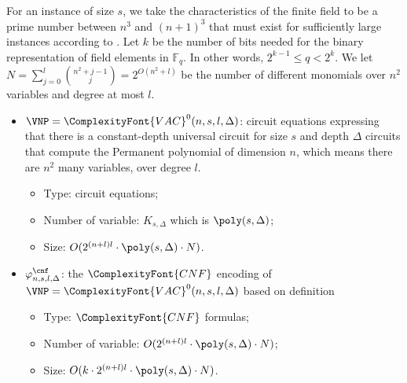 \documentclass[11pt,letter]{article}
\theoremstyle{remark} %
\newcommand{\alg}{\ComplexityFont{alg}}
\newcommand{\IPS}{%
    {
        \ComplexityFont{IPS} 
    }
}
\newcommand{\CNF}{ %
    {
        \ComplexityFont{CNF}
    }
}
\newcommand{\VAL}{ %
    {
        \ComplexityFont{VAL}
    }
}
\newcommand{\cd}{ %
    {
        \ComplexityFont{c.d.}
    }
}
\newcommand{\VAC}{
    {
        \ComplexityFont{VAC}
    }
}
\begin{document}
{    %


    For an instance of size $s$, we take the characteristics of the finite field to be a prime number between $n^3$ and $(n+1)^3$ that must exist for sufficiently large instances according to \cite{cheng2010explicit}. Let $k$ be the number of bits needed for the binary representation of field elements in $\mathbb{F}_q$. In other words, $2^{k-1} \leq q < 2^k $.
    We let $N = \sum_{j=0}^l \binom{n^2+j-1}{j}=2^{O(n^2+l)}$ be the number of different monomials over $n^2$ variables and degree at most $l$.
    \begin{itemize}
        \item $\VNP=\VAC^0(n,s,l,\Delta)$: circuit equations expressing that there is a constant-depth universal circuit for size $s$ and depth $\Delta$ circuits that compute the Permanent polynomial of dimension $n$, which means there are $n^2$ many variables, over degree $l$.
        \begin{itemize}
                \item Type: circuit equations;
                \item Number of variable: $K_{s, \Delta}$ which is $\poly(s, \Delta)$;
                \item Size: $O(2^{(n+l)l} \cdot \poly(s, \Delta) \cdot N)$.
            \end{itemize}
        \item $\varphi_{n,s,l,\Delta}^\cnf$: the $\CNF$ encoding of $\VNP=\VAC^0(n,s,l,\Delta)$ based on definition 
            \begin{itemize}
                \item Type: $\CNF$ formulas;
                \item Number of variable: $O(2^{(n+l)l} \cdot \poly(s, \Delta) \cdot N)$;
                \item Size: $O(k \cdot 2^{(n+l)l} \cdot \poly(s, \Delta) \cdot N)$.

\end{itemize}
\end{itemize}}
\end{document}
